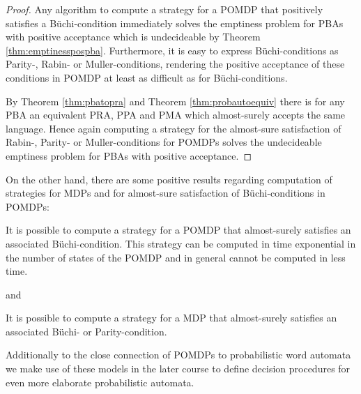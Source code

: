 \begin{proof}
  Any algorithm to compute a strategy for a \ac{POMDP} that positively 
  satisfies a Büchi-condition immediately solves the emptiness problem for
  \acp{PBA} with positive acceptance which is undecideable by Theorem 
  \ref{thm:emptinesspospba}. Furthermore, it is easy to express 
  Büchi-conditions as Parity-, Rabin- or Muller-conditions, rendering the 
  positive acceptance of these conditions in \ac{POMDP} at least as difficult
  as for Büchi-conditions. 
  
  By Theorem \ref{thm:pbatopra} and Theorem \ref{thm:probautoequiv} there is 
  for any \ac{PBA} an equivalent \ac{PRA}, \ac{PPA} and \ac{PMA} which 
  almost-surely accepts the same language. Hence again computing a strategy for 
  the almost-sure satisfaction of Rabin-, Parity- or Muller-conditions for 
  \acp{POMDP} solves the undecideable emptiness problem for \acp{PBA} with 
  positive acceptance.
\end{proof}
On the other hand, there are some positive results regarding computation of 
strategies for \acp{MDP} and for almost-sure satisfaction of Büchi-conditions
in \acp{POMDP}:
\begin{theorem}
  \cite[Theorem 5]{QualAnaPOMDP}
  It is possible to compute a strategy for a \ac{POMDP} that almost-surely
  satisfies an associated Büchi-condition. This strategy can be computed in
  time exponential in the number of states of the \ac{POMDP} and in general
  cannot be computed in less time.
  \label{thm:pomdpstratsynthesis}
\end{theorem}
and
\begin{theorem}
  \cite[Theorem 4.1.7.]{QuanStochParityGames}
  It is possible to compute a strategy for a \ac{MDP} that almost-surely
  satisfies an associated Büchi- or Parity-condition.
  \label{thm:mdpstratsynthesis}
\end{theorem} 
Additionally to the close connection of \acp{POMDP} to probabilistic word 
automata we make use of these models in the later course to define decision
procedures for even more elaborate probabilistic automata.

